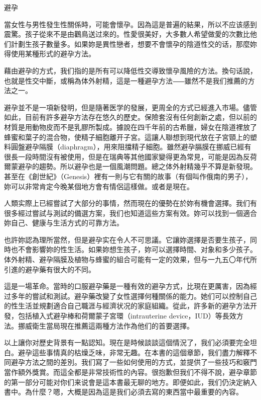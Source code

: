 \documentclass[12pt,UTF8]{ctexbook}
\begin{document}
避孕





當女性与男性發生性關係時，可能會懷孕。因為這是普遍的結果，所以不应该感到震驚。孩子從來不是由鸛鳥送过來的。性愛很美好，大多數人希望做愛的次數比他们計劃生孩子數量多。如果妳是異性戀者，想要不會懷孕的陰道性交的话，那麼妳得使用某種形式的避孕方法。

藉由避孕的方式，我们指的是所有可以降低性交導致懷孕風險的方法。換句话說，也就是性交中斷，或稱為体外射精，這是一種避孕方法⸺雖然不是我们推薦的方法之一。

避孕並不是一項新發明，但是隨著医学的發展，更周全的方式已經進入市場。儘管如此，目前有許多避孕方法存在悠久的歷史。保險套沒有任何創新之處，但以前的材質是用動物皮而不是乳膠所製成。據說在四千年前的古希臘，婦女在陰道裡放了蜂蜜和葉子的混合物，使精子細胞離开子宮。這讓人聯想到現代放在子宮頸上的塑料圓盤避孕隔膜（diaphragm），用來阻擋精子細胞。雖然避孕膈膜在挪威已經有很長一段時間沒有被使用，但是在瑞典等其他國家變得更為常見，可能是因為反荷爾蒙避孕的趨勢。所以避孕也是一個風潮問題。總之体外射精幾乎不算是新發現。甚至在《創世紀》（Genesis）裡有一則与它有關的故事（有個叫作俄南的男子），妳可以非常肯定今晚某個地方會有情侶這樣做。或者是現在。

人類实際上已經嘗試了大部分的事情，然而現在的優勢在於妳有機會選擇。我们有很多經过嘗試与測試的備選方案，我们也知道這些方案有效。妳可以找到一個適合妳自己、健康与生活方式的可靠方法。

也許妳認為理所當然，但是避孕实在令人不可思議。它讓妳選擇是否要生孩子，同時也不會影響妳的性生活。如果妳想生孩子，妳可以選擇時間、对象和多少孩子。体外射精、避孕隔膜及植物与蜂蜜的組合可能有一定的效果，但与一九五〇年代所引進的避孕藥有很大的不同。

這是一場革命。當時的口服避孕藥是一種有效的避孕方式，比現在更厲害，因為經过多年的嘗試和測試。避孕藥改變了女性選擇何種關係的能力。她们可以控制自己的性生活並規劃適合自己職涯与經濟状况的家庭組織。從此，許多新的避孕方法开發，包括植入式避孕棒和荷爾蒙子宮環（intrauterine device，IUD）等長效方法。挪威衛生當局現在推薦這兩種方法作為他们的首要選擇。

以上讓你对歷史背景有一點認知。現在是時候談談這個情況了，我们必須要完全坦白。避孕這些事情真的枯燥乏味，非常无趣。在本書的這個章節，我们盡力解釋不同避孕方法之間的差別。我们寫了一些如何使用的方式，並提供了一些技巧和竅門當作額外獎賞。而這全都是非常技術性的內容。很抱歉但我们不得不說，避孕章節的第一部分可能对你们来说會是這本書最无聊的地方。即便如此，我们仍決定納入書中。為什麼？嗯，大概是因為這是我们必須去寫的東西當中最重要的內容。
\end{document}
